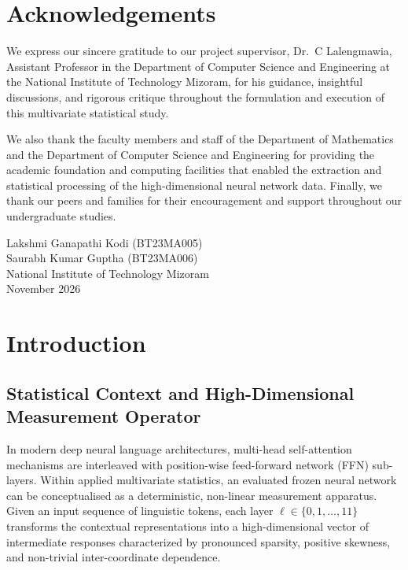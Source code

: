 \documentclass[12pt, a4paper, oneside]{report}
\theoremstyle{definition}
\begin{document}
\chapter*{Acknowledgements}

We express our sincere gratitude to our project supervisor, Dr.\ C Lalengmawia, Assistant Professor in the Department of Computer Science and Engineering at the National Institute of Technology Mizoram, for his guidance, insightful discussions, and rigorous critique throughout the formulation and execution of this multivariate statistical study.

We also thank the faculty members and staff of the Department of Mathematics and the Department of Computer Science and Engineering for providing the academic foundation and computing facilities that enabled the extraction and statistical processing of the high-dimensional neural network data. Finally, we thank our peers and families for their encouragement and support throughout our undergraduate studies.

\vspace{1.2cm}
\noindent Lakshmi Ganapathi Kodi (BT23MA005)\\
Saurabh Kumar Guptha (BT23MA006)\\
National Institute of Technology Mizoram\\
November 2026

\tableofcontents
\listoffigures
\listoftables

\clearpage
{}
\setcounter{page}{1}

\chapter{Introduction}

\section{Statistical Context and High-Dimensional Measurement Operator}

In modern deep neural language architectures, multi-head self-attention mechanisms are interleaved with position-wise feed-forward network (FFN) sub-layers. Within applied multivariate statistics, an evaluated frozen neural network can be conceptualised as a deterministic, non-linear measurement apparatus. Given an input sequence of linguistic tokens, each layer $\ell \in \{0, 1, \dots, 11\}$ transforms the contextual representations into a high-dimensional vector of intermediate responses characterized by pronounced sparsity, positive skewness, and non-trivial inter-coordinate dependence.
\end{document}
